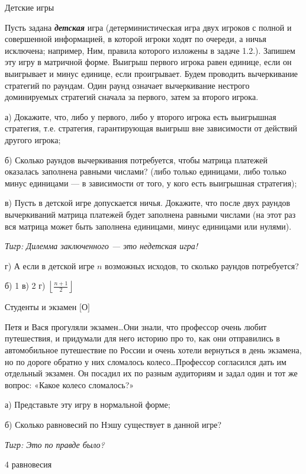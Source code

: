 \begin{problem}
 Детские игры\cite{ewerhart:clg} \par %
Пусть задана {\bf {\it детская}} игра (детерминистическая игра двух игроков с полной и совершенной информацией, в которой игроки ходят по очереди, а ничья исключена; например, Ним, правила которого изложены в задаче 1.2.). Запишем эту игру в матричной форме. Выигрыш первого игрока равен единице, если он выигрывает и минус единице, если проигрывает. Будем проводить вычеркивание стратегий по раундам. Один раунд означает вычеркивание нестрого доминируемых стратегий сначала за первого, затем за второго игрока.\par
а)	Докажите, что, либо у первого, либо у второго игрока есть выигрышная стратегия, т.е. стратегия, гарантирующая выигрыш вне зависимости от действий другого игрока;\par
б)	Сколько раундов вычеркивания потребуется, чтобы матрица платежей оказалась заполнена равными числами? (либо только единицами, либо только минус единицами — в зависимости от того, у кого есть выигрышная стратегия);\par
в)	Пусть в детской игре допускается ничья. Докажите, что после двух раундов вычеркиваний матрица платежей будет заполнена равными числами (на этот раз вся матрица может быть заполнена единицами, минус единицами или нулями).\par
{\it Тигр: Дилемма заключенного — это недетская игра!}\par

г) А если в детской игре $n$ возможных исходов, то сколько раундов потребуется?



\begin{sol}
б) 1 в) 2 г) $\left\lfloor  \frac{n+1}{2} \right\rfloor$
\end{sol}
\end{problem}



\begin{problem}
 Студенты и экзамен $[$О$]$\par
Петя и Вася прогуляли экзамен\ldots Они знали, что профессор очень любит путешествия, и придумали для него историю про то, как они отправились в автомобильное путешествие по России и очень хотели вернуться в день экзамена, но по дороге обратно у них сломалось колесо\ldots Профессор согласился дать им отдельный экзамен. Он посадил их по разным аудиториям и задал один и тот же вопрос: «Какое колесо сломалось?»\par
а)	Представьте эту игру в нормальной форме;\par
б)	Сколько равновесий по Нэшу существует в данной игре?\par
{\it Тигр: Это по правде было?}\par



\begin{sol}
4 равновесия
\end{sol}
\end{problem}



